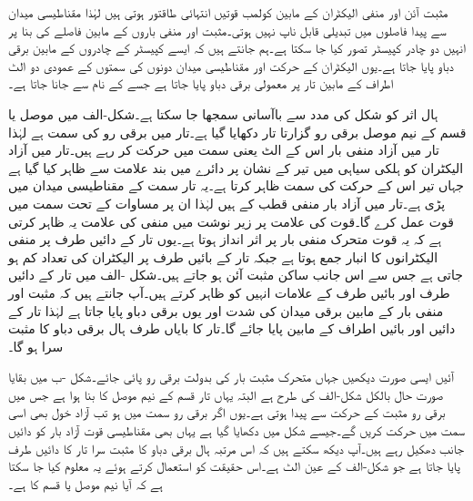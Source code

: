 مثبت آئن اور منفی الیکٹران کے مابین کولمب قوتیں انتہائی طاقتور ہوتی ہیں لہٰذا مقناطیسی میدان سے پیدا فاصلوں میں تبدیلی قابل ناپ نہیں ہوتی۔مثبت اور منفی باروں کے مابین فاصلے کی بنا پر انہیں دو چادر کپیسٹر تصور کیا جا سکتا ہے۔ہم جانتے ہیں کہ ایسے کپیسٹر کے چادروں کے مابین برقی دباو پایا جاتا ہے۔یوں الیکٹران کے حرکت اور مقناطیسی میدان دونوں کی سمتوں کے عمودی دو الٹ اطراف کے مابین تار پر معمولی برقی دباو پایا جاتا ہے جسے  کے نام سے جانا جاتا ہے۔

ہال اثر کو شکل  کی مدد سے باآسانی سمجھا جا سکتا ہے۔شکل-الف میں موصل یا  قسم کے نیم موصل برقی رو گزارتا تار دکھایا گیا ہے۔تار میں برقی رو  کی سمت  ہے  لہٰذا تار میں آزاد منفی بار اس کے الٹ یعنی  سمت  میں حرکت کر رہے ہیں۔تار میں آزاد الیکٹران کو ہلکی سیاہی میں تیر کے نشان پر دائرے میں بند  علامت سے ظاہر کیا گیا ہے جہاں تیر اس کے حرکت کی سمت ظاہر کرتا ہے۔یہ تار  سمت کے مقناطیسی میدان میں پڑی ہے۔تار میں آزاد بار منفی قطب کے ہیں لہٰذا ان پر مساوات  کے تحت  سمت میں قوت  عمل کرے گا۔قوت کی علامت پر زیر نوشت میں منفی کی علامت یہ ظاہر کرتی ہے کہ یہ قوت متحرک منفی بار پر اثر انداز ہوتا ہے۔یوں تار کے دائیں طرف پر منفی الیکٹرانوں کا انبار جمع ہوتا ہے جبکہ تار کے بائیں طرف پر الیکٹران کی تعداد کم ہو جاتی ہے جس سے اس جانب ساکن مثبت آئن  ہو جاتے ہیں۔شکل -الف میں تار کے دائیں طرف  اور بائیں طرف   کے علامات انہیں کو ظاہر کرتے ہیں۔آپ جانتے ہیں کہ مثبت اور  منفی بار  کے مابین برقی میدان کی شدت  اور یوں برقی دباو پایا جاتا ہے لہٰذا تار کے دائیں اور بائیں اطراف کے مابین  پایا جائے گا۔تار کا بایاں طرف ہال برقی دباو کا مثبت سرا ہو گا۔

آئیں ایسی صورت دیکھیں جہاں متحرک مثبت بار کی بدولت برقی رو پائی جائے۔شکل -ب میں بقایا صورت حال بالکل شکل-الف کی طرح ہے البتہ یہاں تار  قسم کے نیم موصل کا بنا ہوا ہے جس میں برقی رو مثبت  کے حرکت سے پیدا ہوتی ہے۔یوں اگر برقی رو  سمت میں ہو تب آزاد خول بھی اسی سمت میں حرکت کریں گے۔جیسے شکل میں دکھایا گیا ہے یہاں بھی مقناطیسی قوت آزاد بار کو دائیں جانب دھکیل رہے ہیں۔آپ دیکھ سکتے ہیں کہ اس مرتبہ ہال برقی دباو کا مثبت سرا تار کا دائیں طرف پایا جاتا ہے جو شکل-الف کے عین الٹ ہے۔اس حقیقت کو استعمال کرتے ہوئے یہ معلوم کیا جا سکتا ہے کہ آیا  نیم موصل  یا  قسم کا ہے۔


